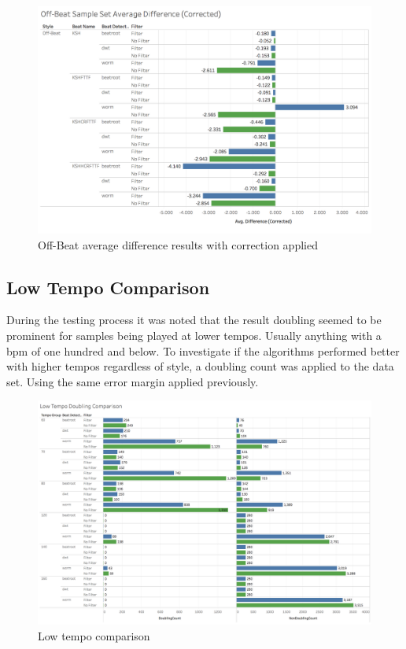 \documentclass[a4paper, 11pt]{article}
\begin{document}
\begin{figure}[h]
\centering
\includegraphics[scale=.25]{images/OBSSADC.jpg}
\caption{Off-Beat average difference results with correction applied}
\label{fig: offAveDiffCor}
\end{figure}

\subsection{Low Tempo Comparison}
During the testing process it was noted that the result doubling seemed to be prominent for samples being played at lower tempos. Usually anything with a bpm of one hundred and below. To investigate if the algorithms performed better with higher tempos regardless of style, a doubling count was applied to the data set. Using the same error margin applied previously. 

\begin{figure}
\centering
\includegraphics[scale=0.25]{images/LowDoubling.jpg}
\caption{Low tempo comparison}
\label{fig: lowTemCom}
\end{figure}
\end{document}
